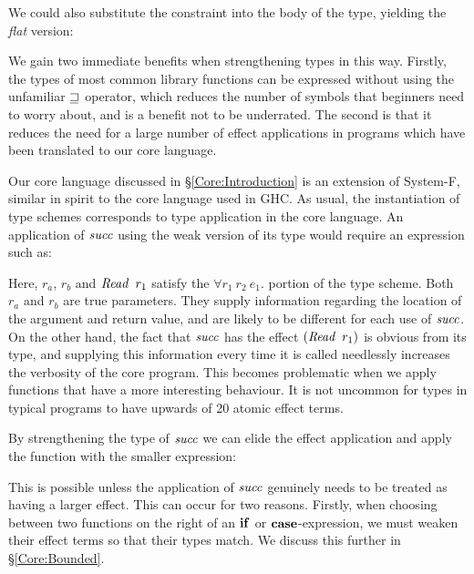 
We could also substitute the constraint into the body of the type, yielding the \emph{flat} version:


We gain two immediate benefits when strengthening types in this way. Firstly, the types of most common library functions can be expressed without using the unfamiliar $\sqsupseteq$ operator, which reduces the number of symbols that beginners need to worry about, and is a benefit not to be underrated. The second is that it reduces the need for a large number of effect applications in programs which have been translated to our core language.

Our core language discussed in \S\ref{Core:Introduction} is an extension of System-F, similar in spirit to the core language used in GHC. As usual, the instantiation of type schemes corresponds to type application in the core language. An application of $\operatorname{\mathit{succ}}$ using the weak version of its type would require an expression such as:


Here, $r_a$, $r_b$ and $\operatorname{\mathit{Read}} \ r_1$ satisfy the $\forall r_1 \ r_2 \ e_1.$ portion of the type scheme. Both $r_a$ and $r_b$ are true parameters. They supply information regarding the location of the argument and return value, and are likely to be different for each use of $\operatorname{\mathit{succ}}$. On the other hand, the fact that $\operatorname{\mathit{succ}}$ has the effect $(\operatorname{\mathit{Read}} \ r_1)$ is obvious from its type, and supplying this information every time it is called needlessly increases the verbosity of the core program. This becomes problematic when we apply functions that have a more interesting behaviour. It is not uncommon for types in typical programs to have upwards of 20 atomic effect terms. 

By strengthening the type of $\operatorname{\mathit{succ}}$ we can elide the effect application and apply the function with the smaller expression:


This is possible unless the application of $\operatorname{\mathit{succ}}$ genuinely needs to be treated as having a larger effect. This can occur for two reasons. Firstly, when choosing between two functions on the right of an $\textrm{\textbf{if}}$ or $\textrm{\textbf{case}}$-expression, we must weaken their effect terms so that their types match. We discuss this further in \S\ref{Core:Bounded}. 

